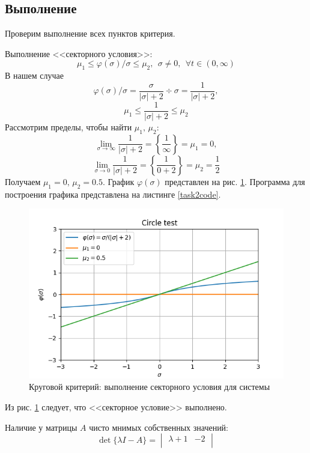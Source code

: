 \documentclass[a4paper, 12pt]{article}
\begin{document}
    \subsection{Выполнение}
    Проверим выполнение всех пунктов критерия.
    \begin{compactitem}
        \item Выполнение <<секторного условия>>:
        $$\mu_1\leq\varphi(\sigma)/\sigma\leq\mu_2,\ \ \sigma\neq0,\ \ \forall t\in(0,\infty)$$
        В нашем случае
        $$\varphi(\sigma)/\sigma=\dfrac{\sigma}{|\sigma|+2}\div \sigma=\dfrac{1}{|\sigma|+2},$$
        $$\mu_1\leq\dfrac{1}{|\sigma|+2}\leq\mu_2$$
        Рассмотрим пределы, чтобы найти $\mu_1,\,\mu_2$:
        $$\lim\limits_{\sigma\to\infty}\dfrac{1}{|\sigma|+2}=\left\{\dfrac{1}{\infty}\right\}=\mu_1=0,$$
        $$\lim\limits_{\sigma\to0}\dfrac{1}{|\sigma|+2}=\left\{\dfrac{1}{0+2}\right\}=\mu_2=\dfrac{1}{2}$$
        Получаем $\mu_1=0,\,\mu_2=0.5$. График $\varphi(\sigma)$ представлен на рис. \ref{fig:task2}.
        Программа для построения графика представлена на листинге \ref{task2code}.
        \begin{figure}[H]
            \centering
            \includegraphics[scale=0.55]{task2.png}
            \captionsetup{skip=0pt}
            \caption{Круговой критерий: выполнение секторного условия для системы}
            \label{fig:task2}
        \end{figure}
        Из рис. \ref{fig:task2} следует, что <<секторное условие>> выполнено.
        \item Наличие у матрицы $A$ чисто мнимых собственных значений:
        $$
        \det{\{\lambda I-A\}}=
        \begin{vmatrix}
            \lambda+1 & -2\\

\end{vmatrix}$$
\end{compactitem}
\end{document}

